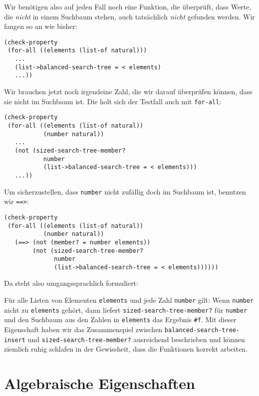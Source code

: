%
Wir benötigen also auf jeden Fall noch eine Funktion, die überprüft,
dass Werte, die \emph{nicht} in einem Suchbaum stehen, auch
tatsächlich \emph{nicht} gefunden werden.  Wir fangen so an wie bisher:
%
\begin{lstlisting}
(check-property
 (for-all ((elements (list-of natural)))
   ...
   (list->balanced-search-tree = < elements)
   ...))
\end{lstlisting}
%
Wir brauchen jetzt noch irgendeine Zahl, die wir darauf überprüfen
können, dass sie nicht im Suchbaum ist.  Die holt sich der Testfall
auch mit \lstinline{for-all}:
%
\begin{lstlisting}
(check-property
 (for-all ((elements (list-of natural))
           (number natural))
   ...
   (not (sized-search-tree-member?
           number
           (list->balanced-search-tree = < elements)))
   ...))
\end{lstlisting}
%
Um sicherzustellen, dass
\lstinline{number} nicht zufällig doch im Suchbaum ist, benutzen
wir \lstinline{==>}:
%
\begin{lstlisting}
(check-property
 (for-all ((elements (list-of natural))
           (number natural))
   (==> (not (member? = number elements))
        (not (sized-search-tree-member?
              number
              (list->balanced-search-tree = < elements))))))
\end{lstlisting}
%
Da steht also umgangssprachlich formuliert:

Für alle Listen von
Elementen \lstinline{elements} und jede Zahl \lstinline{number} gilt:
Wenn \lstinline{number} nicht zu \lstinline{elements} gehört, dann
liefert \lstinline{sized-search-tree-member?} für \lstinline{number}
und den Suchbaum aus den Zahlen in \lstinline{elements} das Ergebnis
\lstinline{#f}.
Mit dieser Eigenschaft haben wir das Zusammenspiel zwischen
\lstinline{balanced-search-tree-insert} und
\lstinline{sized-search-tree-member?} ausreichend beschrieben und
können ziemlich ruhig schlafen in der Gewissheit, dass die Funktionen
korrekt arbeiten.

\section{Algebraische Eigenschaften}
\label{sec:algebraische-eigenschaften}

